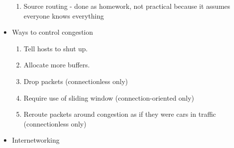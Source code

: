 \documentclass{scrartcl}
\begin{document}
\begin{itemize}
\begin{enumerate}
\item Source routing - done as homework, not practical because it assumes everyone knows everything
\end{enumerate}
\item Ways to control congestion
\begin{enumerate}
\item Tell hosts to shut up.
\item Allocate more buffers.
\item Drop packets (connectionless only)
\item Require use of sliding window (connection-oriented only)
\item Reroute packets around congestion as if they were cars in traffic (connectionless only)
\end{enumerate}
\item Internetworking
\end{itemize}
\end{document}
